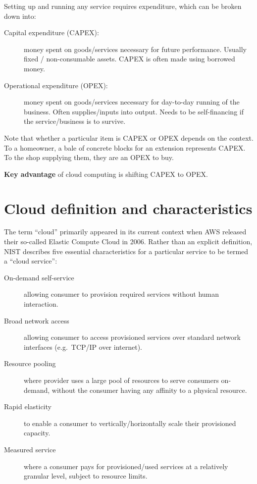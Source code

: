 Setting up and running any service requires expenditure, which can be
broken down into:

\begin{description}
\item[Capital expenditure (CAPEX):]
money spent on goods/services necessary for future performance. Usually
fixed / non-consumable assets. CAPEX is often made using borrowed money.
\item[Operational expenditure (OPEX):]
money spent on goods/services necessary for day-to-day running of the
business. Often supplies/inputs into output. Needs to be self-financing
if the service/business is to survive.
\end{description}

Note that whether a particular item is CAPEX or OPEX depends on the
context. To a homeowner, a bale of concrete blocks for an extension
represents CAPEX. To the shop supplying them, they are an OPEX to buy.

\textbf{Key advantage} of cloud computing is shifting CAPEX to OPEX.

\section{Cloud definition and characteristics}
\label{sec:essential-characteristics}

The term ``cloud'' primarily appeared in its current context when AWS
released their so-called Elastic Compute Cloud in 2006. Rather than an
explicit definition, NIST describes five essential characteristics for a
particular service to be termed a ``cloud service'':

\begin{description}
\item[On-demand self-service]
allowing consumer to provision required services without human
interaction.
\item[Broad network access]
allowing consumer to access provisioned services over standard network
interfaces (e.g.~TCP/IP over internet).
\item[Resource pooling]
where provider uses a large pool of resources to serve consumers
on-demand, without the consumer having any affinity to a physical
resource.
\item[Rapid elasticity]
to enable a consumer to vertically/horizontally scale their provisioned
capacity.
\item[Measured service]
where a consumer pays for provisioned/used services at a relatively
granular level, subject to resource limits.
\end{description}

